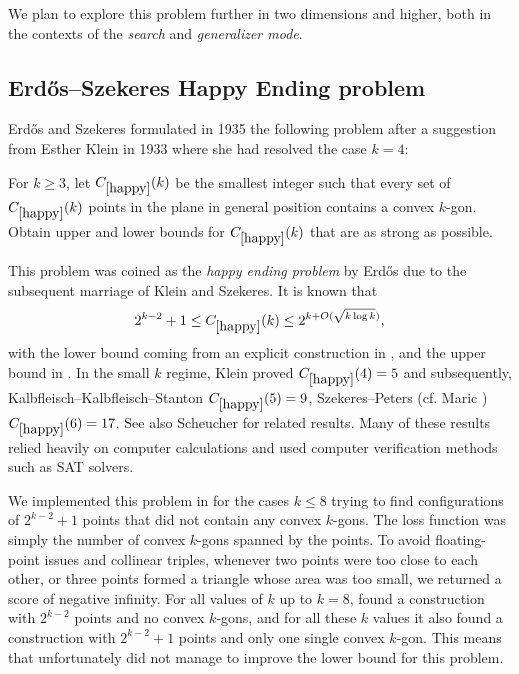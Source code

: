 We plan to explore this problem further in two dimensions and higher, both in the contexts of the \textit{search} and \textit{generalizer mode}.


\subsection{Erd\H{o}s--Szekeres Happy Ending problem}

Erd\H{o}s and Szekeres formulated in 1935 the following problem \cite{erdos1935} after a suggestion from Esther Klein in 1933 where she had resolved the case $k=4$:

\renewcommand{\problemURL}{https://google-deepmind.github.io/alphaevolve_repository_of_problems/problems/58.html}

\begin{problem}\label{happy} For $k \geq 3$, let $C_{\ref{happy}}(k)$ be the smallest integer such that
every set of $C_{\ref{happy}}(k)$ points in the plane in general position contains a convex $k$-gon. Obtain upper and lower bounds for $C_{\ref{happy}}(k)$ that are as strong as possible.
\end{problem}

This problem was coined as the \emph{happy ending problem} by Erd\H{o}s due to the subsequent marriage of Klein and Szekeres. It is known that
$$ 2^{k-2}+1 \leq C_{\ref{happy}}(k) \leq 2^{k + O(\sqrt{k \log k})},$$
with the lower bound coming from an explicit construction in \cite{erdos1960}, and the upper bound in \cite{holmsen2020}.  In the small $k$ regime, Klein proved $C_{\ref{happy}}(4) = 5$ and subsequently, Kalbfleisch--Kalbfleisch--Stanton \cite{kalbfleisch1970} $C_{\ref{happy}}(5) = 9$, Szekeres--Peters \cite{szekeres2006} (cf. Maric \cite{maric2019}) $C_{\ref{happy}}(6) = 17$. See also Scheucher \cite{scheucher2020} for related results. Many of these results relied heavily on computer calculations and used computer verification methods such as SAT solvers.

We implemented this problem in \AlphaEvolve for the cases $k\leq 8$ trying to find configurations of $2^{k-2}+1$ points that did not contain any convex $k$-gons. The loss function was simply the number of convex $k$-gons spanned by the points. To avoid floating-point issues and collinear triples, whenever two points were too close to each other, or three points formed a triangle whose area was too small, we returned a score of negative infinity. For all values of $k$ up to $k=8$, \AlphaEvolve found a construction with $2^{k-2}$ points and no convex $k$-gons, and for all these $k$ values it also found a construction with $2^{k-2}+1$ points and only one single convex $k$-gon. This means that unfortunately \AlphaEvolve did not manage to improve the lower bound for this problem.


